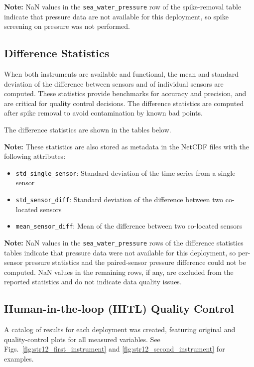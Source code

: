 

\textbf{Note:} NaN values in the \texttt{sea\_water\_pressure} row of the spike-removal table indicate that pressure data are not available for this deployment, so spike screening on pressure was not performed.

\subsection{Difference Statistics}
When both instruments are available and functional, 
the mean and standard deviation of the difference between sensors and of individual sensors are computed. 
These statistics provide benchmarks for accuracy and precision, and are critical for quality control decisions.
The difference statistics are computed after spike removal to avoid contamination by known bad points.

The difference statistics are shown in the tables below.



\textbf{Note:} These statistics are also stored as metadata in the NetCDF files with the following attributes:
\begin{itemize}
\item \texttt{std\_single\_sensor}: Standard deviation of the time series from a single sensor
\item \texttt{std\_sensor\_diff}: Standard deviation of the difference between two co-located sensors
\item \texttt{mean\_sensor\_diff}: Mean of the difference between two co-located sensors
\end{itemize}

\textbf{Note:} NaN values in the \texttt{sea\_water\_pressure} rows of the difference statistics tables indicate that pressure data were not available for this deployment, so per-sensor pressure statistics and the paired-sensor pressure difference could not be computed. NaN values in the remaining rows, if any, are excluded from the reported statistics and do not indicate data quality issues.

\subsection{Human-in-the-loop (HITL) Quality Control}
A catalog of results for each deployment was created, featuring original and quality-control plots for all measured variables. 
See Figs.~\ref{fig:str12_first_instrument} and \ref{fig:str12_second_instrument} for examples.


